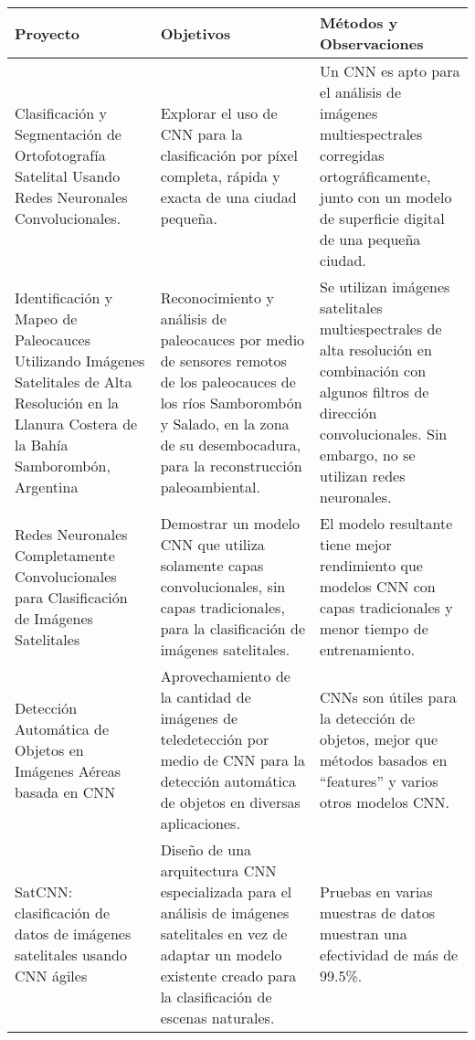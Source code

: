 \begin{center}
    \vspace{-\topsep}
    \begin{table}[h!]
        \small
        \begin{tabular}{|m{4cm}|m{5cm}|m{6.2cm}|}
            \hline
            \bf Proyecto & \bf Objetivos & \bf Métodos y Observaciones \\
            \hline
            Clasificación y Segmentación de Ortofotografía Satelital Usando Redes Neuronales Convolucionales. \autocite{langkvist-2016} \hspace{-\textwidth} & Explorar el uso de CNN para la clasificación por píxel completa, rápida y exacta de una ciudad pequeña. & Un CNN es apto para el análisis de imágenes multiespectrales corregidas ortográficamente, junto con un modelo de superficie digital de una pequeña ciudad. \\
            \hline
            Identificación y Mapeo de Paleocauces Utilizando Imágenes Satelitales de Alta Resolución en la Llanura Costera de la Bahía Samborombón, Argentina \autocite{luengo-2016} & Reconocimiento y análisis de paleocauces por medio de sensores remotos de los paleocauces de los ríos Samborombón y Salado, en la zona de su desembocadura, para la reconstrucción paleoambiental. & Se utilizan imágenes satelitales multiespectrales de alta resolución en combinación con algunos filtros de dirección convolucionales. Sin embargo, no se utilizan redes neuronales. \\
            \hline
            Redes Neuronales Completamente Convolucionales para Clasificación de Imágenes Satelitales \autocite{maggiori-2016-1} & Demostrar un modelo CNN que utiliza solamente capas convolucionales, sin capas tradicionales, para la clasificación de imágenes satelitales. & El modelo resultante tiene mejor rendimiento que modelos CNN con capas tradicionales y menor tiempo de entrenamiento. \\
            \hline
            Detección Automática de Objetos en Imágenes Aéreas basada en CNN \autocite{sevo-2016} & Aprovechamiento de la cantidad de imágenes de teledetección por medio de CNN para la detección automática de objetos en diversas aplicaciones. & CNNs son útiles para la detección de objetos, mejor que métodos basados en \enquote{features} y varios otros modelos CNN. \\
            \hline
            SatCNN: clasificación de datos de imágenes satelitales usando CNN ágiles \autocite{zhong-2016} & Diseño de una arquitectura CNN especializada para el análisis de imágenes satelitales en vez de adaptar un modelo existente creado para la clasificación de escenas naturales. & Pruebas en varias muestras de datos muestran una efectividad de más de 99.5\%. \\

\end{tabular}
\end{table}
\end{center}
